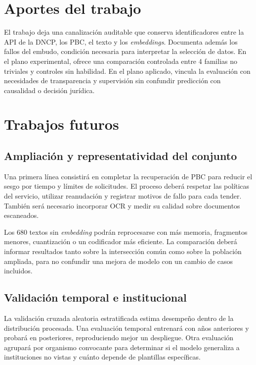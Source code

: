 \section{Aportes del trabajo}

El trabajo deja una canalización auditable que conserva identificadores entre la API de la DNCP, los PBC, el texto y los \textit{embeddings}. Documenta además los fallos del embudo, condición necesaria para interpretar la selección de datos. En el plano experimental, ofrece una comparación controlada entre 4 familias no triviales y controles sin habilidad. En el plano aplicado, vincula la evaluación con necesidades de transparencia y supervisión sin confundir predicción con causalidad o decisión jurídica.

\section{Trabajos futuros}

\subsection{Ampliación y representatividad del conjunto}

Una primera línea consistirá en completar la recuperación de PBC para reducir el sesgo por tiempo y límites de solicitudes. El proceso deberá respetar las políticas del servicio, utilizar reanudación y registrar motivos de fallo para cada tender. También será necesario incorporar OCR y medir su calidad sobre documentos escaneados.

Los 680 textos sin \textit{embedding} podrán reprocesarse con más memoria, fragmentos menores, cuantización o un codificador más eficiente. La comparación deberá informar resultados tanto sobre la intersección común como sobre la población ampliada, para no confundir una mejora de modelo con un cambio de casos incluidos.

\subsection{Validación temporal e institucional}

La validación cruzada aleatoria estratificada estima desempeño dentro de la distribución procesada. Una evaluación temporal entrenará con años anteriores y probará en posteriores, reproduciendo mejor un despliegue. Otra evaluación agrupará por organismo convocante para determinar si el modelo generaliza a instituciones no vistas y cuánto depende de plantillas específicas.

